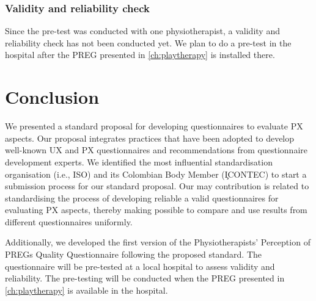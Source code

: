 \subsubsection{Validity and reliability check}
Since the pre-test was conducted with one physiotherapist, a validity and reliability check has not been conducted yet. We plan to do a pre-test in the hospital after the \ac{PREG} presented in \autoref{ch:playtherapy} is installed there.


\section{Conclusion} %
\label{sec:conclusion_2}
We presented a standard proposal for developing questionnaires to evaluate \ac{PX} aspects. Our proposal integrates practices that have been adopted to develop well-known \ac{UX} and \ac{PX} questionnaires and recommendations from questionnaire development experts. We identified the most influential standardisation organisation (i.e., \ac{ISO}) and its Colombian Body Member (\c{ICONTEC}) to start a submission process for our standard proposal. Our may contribution is related to standardising the process of developing reliable a valid questionnaires for evaluating \ac{PX} aspects, thereby making possible to compare and use results from different questionnaires uniformly.

Additionally, we developed the first version of the Physiotherapists' Perception of \acp{PREG} Quality Questionnaire following the proposed standard. The questionnaire will be pre-tested at a local hospital to assess validity and reliability. The pre-testing will be conducted when the \ac{PREG} presented in \autoref{ch:playtherapy} is available in the hospital.
